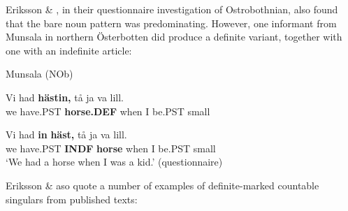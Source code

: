 
Eriksson \& \citet{Rendahl1999}, in their questionnaire investigation of Ostrobothnian, also found that the bare noun pattern was predominating. However, one informant from Munsala in northern Österbotten did produce a definite variant, together with one with an indefinite article:


\item 

Munsala (NOb)



\item 


 \ea\label{}
\gll Vi  had  \textbf{hästin,} tå  ja  va  lill.\\


we  have.PST  \textbf{horse.DEF} when  I   be.PST  small\\

\item 


 \ea\label{}
\gll Vi  had  \textbf{in} \textbf{häst,} tå  ja  va  lill.\\


we  have.PST  \textbf{INDF} \textbf{horse} when  I  be.PST  small\\

\glt ‘We had a horse when I was a kid.’ (questionnaire)

\z

Eriksson \& \citet{Rendahl1999} aso quote a number of examples of definite-marked countable singulars from published texts:

